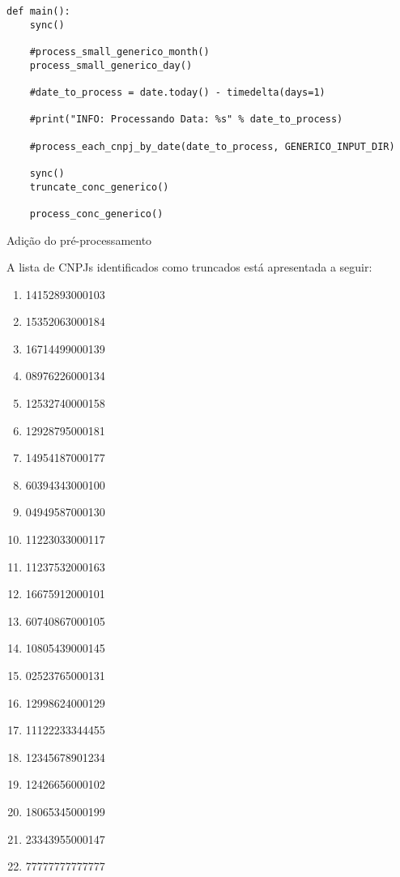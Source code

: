 \documentclass{article}      %
\begin{document}
\begin{listing}[H]
\begin{verbatim}
def main():
    sync()
    
    #process_small_generico_month()
    process_small_generico_day()

    #date_to_process = date.today() - timedelta(days=1)
    
    #print("INFO: Processando Data: %s" % date_to_process)
    
    #process_each_cnpj_by_date(date_to_process, GENERICO_INPUT_DIR)

    sync()
    truncate_conc_generico()
    
    process_conc_generico()
\end{verbatim}

\caption{Adição do pré-processamento}
\label{code:processamento}

\end{listing}


A lista de CNPJs identificados como truncados está apresentada a seguir:

\begin{enumerate}
\item 14152893000103 
\item 15352063000184 
\item 16714499000139
\item 08976226000134
\item 12532740000158 
\item 12928795000181 
\item 14954187000177 
\item 60394343000100 
\item 04949587000130 
\item 11223033000117
\item 11237532000163
\item 16675912000101 
\item 60740867000105 
\item 10805439000145
\item 02523765000131
\item 12998624000129 
\item 11122233344455 
\item 12345678901234
\item 12426656000102
\item 18065345000199
\item 23343955000147
\item 77777777777777
\end{enumerate}
 
\end{document}

